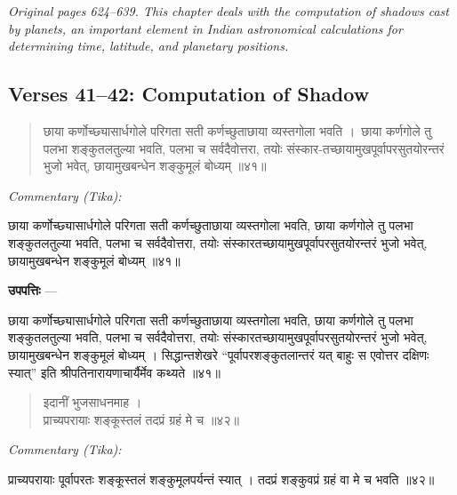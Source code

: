 \documentclass[11pt,a4paper]{article}
\newcommand{\skt}[1]{{\devanagarifont\color{sktcolor} #1}}
\newenvironment{shloka}{%
  \begin{quote}%
  \smallskip%
  \devanagarifont\color{sktcolor}%
}{%
  \smallskip%
  \end{quote}%
}
\newenvironment{tika}{%
  \smallskip%
  \noindent\textit{Commentary (Tika):}\par%
  \smallskip%
  \hindifont\small%
}{%
  \par\smallskip%
}
\newenvironment{upapatti}{%
  \smallskip%
  \noindent\textbf{\devanagarifont उपपत्तिः} — \devanagarifont\small%
}{%
  \par\smallskip%
}
\newcommand{\ednote}[1]{\textcolor{notecolor}{\textit{#1}}}
\begin{document}
\ednote{Original pages 624--639. This chapter deals with the computation of shadows cast by planets, an important element in Indian astronomical calculations for determining time, latitude, and planetary positions.}

\subsection*{Verses 41--42: Computation of Shadow}

\begin{shloka}
छाया कर्णोच्छ्यासार्धगोले परिगता सती कर्णच्छुताछाया व्यस्तगोला भवति ।\
छाया कर्णगोले तु पलभा शङ्कुतलतुल्या भवति, पलभा च सर्वदैवोत्तरा, तयोः संस्कार-तच्छायामुखपूर्वापरसुतयोरन्तरं भुजो भवेत्, छायामुखबन्धेन शङ्कुमूलं बोध्यम् ॥४१॥
\end{shloka}

\vspace{0.3cm}
\begin{tika}
छाया कर्णोच्छ्यासार्धगोले परिगता सती कर्णच्छुताछाया व्यस्तगोला भवति, छाया कर्णगोले तु पलभा शङ्कुतलतुल्या भवति, पलभा च सर्वदैवोत्तरा, तयोः संस्कारतच्छायामुखपूर्वापरसुतयोरन्तरं भुजो भवेत्, छायामुखबन्धेन शङ्कुमूलं बोध्यम् ॥४१॥
\end{tika}

\vspace{0.3cm}
\begin{upapatti}
छाया कर्णोच्छ्यासार्धगोले परिगता सती कर्णच्छुताछाया व्यस्तगोला भवति, छाया कर्णगोले तु पलभा शङ्कुतलतुल्या भवति, पलभा च सर्वदैवोत्तरा, तयोः संस्कारतच्छायामुखपूर्वापरसुतयोरन्तरं भुजो भवेत्, छायामुखबन्धेन शङ्कुमूलं बोध्यम् । सिद्धान्तशेखरे ``पूर्वापरशङ्कुतलान्तरं यत् बाहुः स एवोत्तर दक्षिणः स्यात्'' इति श्रीपतिनारायणाचार्यैर्मेव कथ्यते ॥४१॥
\end{upapatti}

\vspace{0.5cm}

\begin{shloka}
इदानीं भुजसाधनमाह ।\\[0.5em]
\skt{प्राच्यपरायाः शङ्कूस्तलं तदप्रं ग्रहं मे च} ॥४२॥
\end{shloka}

\vspace{0.3cm}
\begin{tika}
\skt{प्राच्यपरायाः} पूर्वापरतः शङ्कूस्तलं शङ्कुमूलपर्यन्तं स्यात् । तदप्रं शङ्कुवप्रं ग्रहं वा मे च भवति ॥४२॥
\end{tika}

\vspace{0.5cm}
\end{document}
